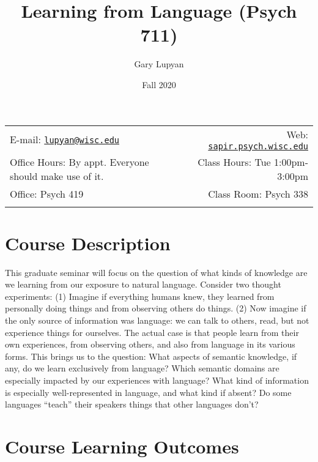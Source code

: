 \documentclass[11pt,man]{article}
\title{Learning from Language (Psych 711)}
\author{Gary Lupyan}
\date{Fall 2020}
\begin{document}
  

		\maketitle
		
	
		\thispagestyle{firststyle}



	\noindent \begin{tabular*}{\textwidth}{ @{\extracolsep{\fill}} lr @{\extracolsep{\fill}}}


E-mail: \texttt{\href{mailto:lupyan@wisc.edu}{\nolinkurl{lupyan@wisc.edu}}} & Web: \href{http://sapir.psych.wisc.edu}{\tt sapir.psych.wisc.edu}\\
Office Hours: By appt. Everyone should make use of
it.  &  Class Hours: Tue 1:00pm-3:00pm\\
Office: Psych 419  & Class Room: Psych 338\\
	&  \\
	\hline
	\end{tabular*}
	
\vspace{2mm}
	


\hypertarget{course-description}{%
\section{Course Description}\label{course-description}}

This graduate seminar will focus on the question of what kinds of
knowledge are we learning from our exposure to natural language.
Consider two thought experiments: (1) Imagine if everything humans knew,
they learned from personally doing things and from observing others do
things. (2) Now imagine if the only source of information was language:
we can talk to others, read, but not experience things for ourselves.
The actual case is that people learn from their own experiences, from
observing others, and also from language in its various forms. This
brings us to the question: What aspects of semantic knowledge, if any,
do we learn exclusively from language? Which semantic domains are
especially impacted by our experiences with language? What kind of
information is especially well-represented in language, and what kind if
absent? Do some languages ``teach'' their speakers things that other
languages don't?

\hypertarget{course-learning-outcomes}{%
\section{Course Learning Outcomes}\label{course-learning-outcomes}}
\end{document}
